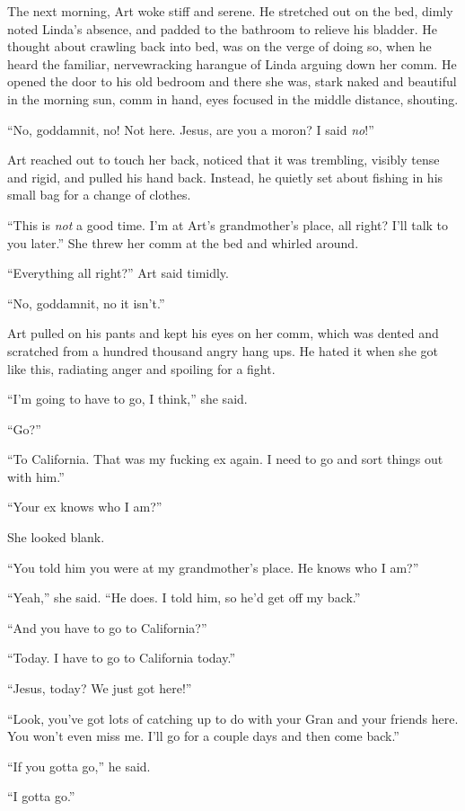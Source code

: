 The next morning, Art woke stiff and serene. He stretched out on
the bed, dimly noted Linda’s absence, and padded to the bathroom to
relieve his bladder. He thought about crawling back into bed, was
on the verge of doing so, when he heard the familiar, nervewracking
harangue of Linda arguing down her comm. He opened the door to his
old bedroom and there she was, stark naked and beautiful in the
morning sun, comm in hand, eyes focused in the middle distance,
shouting.

“No, goddamnit, no! Not here. Jesus, are you a moron? I said
\emph{no}!”

Art reached out to touch her back, noticed that it was trembling,
visibly tense and rigid, and pulled his hand back. Instead, he
quietly set about fishing in his small bag for a change of
clothes.

“This is \emph{not} a good time. I’m at Art’s grandmother’s place,
all right? I’ll talk to you later.” She threw her comm at the bed
and whirled around.

“Everything all right?” Art said timidly.

“No, goddamnit, no it isn’t.”

Art pulled on his pants and kept his eyes on her comm, which was
dented and scratched from a hundred thousand angry hang ups. He
hated it when she got like this, radiating anger and spoiling for a
fight.

“I’m going to have to go, I think,” she said.

“Go?”

“To California. That was my fucking ex again. I need to go and sort
things out with him.”

“Your ex knows who I am?”

She looked blank.

“You told him you were at my grandmother’s place. He knows who I
am?”

“Yeah,” she said. “He does. I told him, so he’d get off my back.”

“And you have to go to California?”

“Today. I have to go to California today.”

“Jesus, today? We just got here!”

“Look, you’ve got lots of catching up to do with your Gran and your
friends here. You won’t even miss me. I’ll go for a couple days and
then come back.”

“If you gotta go,” he said.

“I gotta go.”

